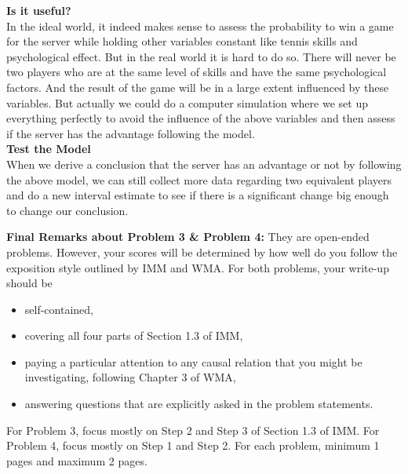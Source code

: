 \documentclass[12pt]{article}
\begin{document}
\noindent\textbf{Is it useful?}\\
In the ideal world, it indeed makes sense to assess the probability to win a game for the server while holding other variables constant like tennis skills and psychological effect. But in the real world it is hard to do so. There will never be two players who are at the same level of skills and have the same psychological factors. And the result of the game will be in a large extent influenced by these variables. But actually we could do a computer simulation where we set up everything perfectly to avoid the influence of the above variables and then assess if the server has the advantage following the model.\\

\noindent\textbf{Test the Model}\\
When we derive a conclusion that the server has an advantage or not by following the above model, we can still collect more data regarding two equivalent players and do a new interval estimate to see if there is a significant change big enough to change our conclusion.












\newpage
\vskip0.25in
\noindent\textbf{Final Remarks about Problem 3 \& Problem 4:} 
They are open-ended problems.  However, your scores will be determined
by how well do you follow the exposition style outlined by IMM and
WMA.  For both problems, your write-up should be 
\begin{itemize}
\item self-contained,
\item covering all four parts of Section 1.3 of IMM,
\item paying a particular attention to any causal relation that you
  might be investigating, following Chapter 3 of WMA,
\item answering questions that are explicitly asked in the problem statements.
\end{itemize}
For Problem 3, focus mostly on Step 2 and Step 3 of Section
1.3 of IMM.  For Problem 4, focus mostly on Step 1 and Step
2.  For each problem, minimum 1 pages and maximum 2 pages.
\end{document}
